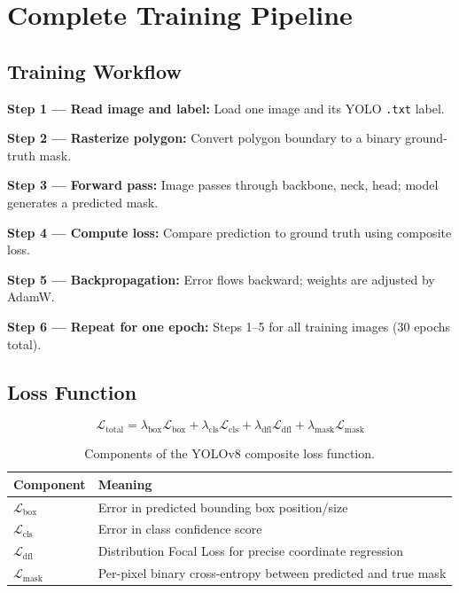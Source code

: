 \documentclass[12pt,a4paper,openany]{report}
\begin{document}
\chapter{Complete Training Pipeline}

\section{Training Workflow}

\textbf{Step 1 --- Read image and label:} Load one image and its YOLO \texttt{.txt} label.

\textbf{Step 2 --- Rasterize polygon:} Convert polygon boundary to a binary ground-truth mask.

\textbf{Step 3 --- Forward pass:} Image passes through backbone, neck, head; model
generates a predicted mask.

\textbf{Step 4 --- Compute loss:} Compare prediction to ground truth using composite loss.

\textbf{Step 5 --- Backpropagation:} Error flows backward; weights are adjusted by AdamW.

\textbf{Step 6 --- Repeat for one epoch:} Steps 1--5 for all training images (30 epochs total).

\section{Loss Function}

\begin{equation}
  \mathcal{L}_{\text{total}}
  = \lambda_\text{box}\mathcal{L}_\text{box}
  + \lambda_\text{cls}\mathcal{L}_\text{cls}
  + \lambda_\text{dfl}\mathcal{L}_\text{dfl}
  + \lambda_\text{mask}\mathcal{L}_\text{mask}
  \label{eq:loss}
\end{equation}

\begin{table}[H]
\centering
\caption{Components of the YOLOv8 composite loss function.}
\renewcommand{\arraystretch}{1.3}
\begin{tabular}{l p{9cm}}
\toprule
\textbf{Component} & \textbf{Meaning} \\
\midrule
$\mathcal{L}_\text{box}$  & Error in predicted bounding box position/size \\
$\mathcal{L}_\text{cls}$  & Error in class confidence score \\
$\mathcal{L}_\text{dfl}$  & Distribution Focal Loss for precise coordinate regression \\
$\mathcal{L}_\text{mask}$ & Per-pixel binary cross-entropy between predicted and true mask \\
\bottomrule
\end{tabular}
\label{tab:loss}
\end{table}
\end{document}
